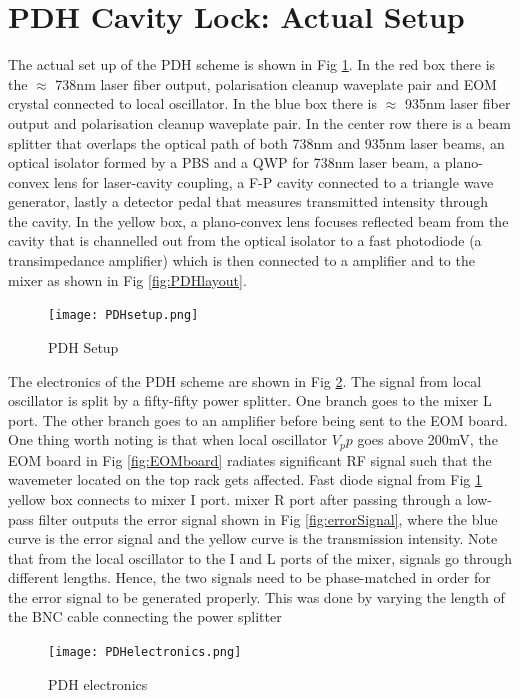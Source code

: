 \documentclass[12pt]{report}
\begin{document}
\section{PDH Cavity Lock: Actual Setup}
The actual set up of the PDH scheme is shown in Fig \ref{fig:PDHsetup}. In the red box there is the $\approx$ 738nm laser fiber output, polarisation cleanup waveplate pair and EOM crystal connected to local oscillator. In the blue box there is $\approx$ 935nm laser fiber output and polarisation cleanup waveplate pair. In the center row there is a beam splitter that overlaps the optical path of both 738nm and 935nm laser beams, an optical isolator formed by a PBS and a QWP for 738nm laser beam, a plano-convex lens for laser-cavity coupling, a F-P cavity connected to a triangle wave generator, lastly a detector pedal that measures transmitted intensity through the cavity. In the yellow box, a plano-convex lens focuses reflected beam from the cavity that is channelled out from the optical isolator to a fast photodiode (a transimpedance amplifier) which is then connected to a amplifier and to the mixer as shown in Fig \ref{fig:PDHlayout}. 

\begin{figure}[H]
    \centering
    \texttt{[image: PDHsetup.png]}
    \caption{PDH Setup}
    \label{fig:PDHsetup}
\end{figure}

The electronics of the PDH scheme are shown in Fig \ref{fig:PDHelectronics}. The signal from local oscillator is split by a fifty-fifty power splitter. One branch goes to the mixer L port. The other branch goes to an amplifier before being sent to the EOM board. One thing worth noting is that when local oscillator $V_pp$ goes above 200mV, the EOM board in Fig \ref{fig:EOMboard} radiates significant RF signal such that the wavemeter located on the top rack gets affected. Fast diode signal from Fig \ref{fig:PDHsetup} yellow box connects to mixer I port. mixer R port after passing through a low-pass filter outputs the error signal shown in Fig \ref{fig:errorSignal}, where the blue curve is the error signal and the yellow curve is the transmission intensity.  Note that from the local oscillator to the I and L ports of the mixer, signals go through different lengths. Hence, the two signals need to be phase-matched in order for the error signal to be generated properly. This was done by varying the length of the BNC cable connecting the power splitter 

\begin{figure}[H]
    \centering
    \texttt{[image: PDHelectronics.png]}
    \caption{PDH electronics}
    \label{fig:PDHelectronics}
\end{figure}
\end{document}
